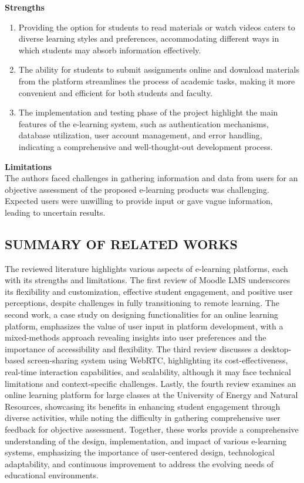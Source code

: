 \documentclass[a4paper,12pt]{article}  %
\begin{document}
\textbf{Strengths }\\
\begin{enumerate}
  \item Providing the option for students to read materials or watch videos caters to
        diverse learning styles and preferences, accommodating different ways in which
        students may absorb information effectively.\\
  \item The ability for students to submit assignments online and download materials
        from the platform streamlines the process of academic tasks, making it more
        convenient and efficient for both students and faculty.\\
  \item The implementation and testing phase of the project highlight the main features
        of the e-learning system, such as authentication mechanisms, database
        utilization, user account management, and error handling, indicating a
        comprehensive and well-thought-out development process.\\
\end{enumerate}

\textbf{Limitations}\\
The authors faced challenges in gathering information and data from
users for an objective assessment of the proposed e-learning products was
challenging. Expected users were unwilling to provide input or gave vague
information, leading to uncertain results.\\

\subsection{SUMMARY OF RELATED WORKS}
The reviewed literature highlights various aspects of e-learning platforms,
each with its strengths and limitations. The first review of Moodle LMS
underscores its flexibility and customization, effective student engagement,
and positive user perceptions, despite challenges in fully transitioning to
remote learning. The second work, a case study on designing functionalities for
an online learning platform, emphasizes the value of user input in platform
development, with a mixed-methods approach revealing insights into user
preferences and the importance of accessibility and flexibility. The third
review discusses a desktop-based screen-sharing system using WebRTC,
highlighting its cost-effectiveness, real-time interaction capabilities, and
scalability, although it may face technical limitations and context-specific
challenges. Lastly, the fourth review examines an online learning platform for
large classes at the University of Energy and Natural Resources, showcasing its
benefits in enhancing student engagement through diverse activities, while
noting the difficulty in gathering comprehensive user feedback for objective
assessment. Together, these works provide a comprehensive understanding of the
design, implementation, and impact of various e-learning systems, emphasizing
the importance of user-centered design, technological adaptability, and
continuous improvement to address the evolving needs of educational
environments.\\
\end{document}
